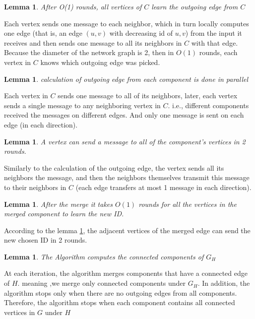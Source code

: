 \documentclass[11pt]{article}
\newtheorem{lemma}[theorem]{Lemma}
\begin{document}
\begin{lemma}
After O(1) rounds, all vertices of $C$ learn the outgoing edge from $C$ 
\end{lemma}
Each vertex sends one message to each neighbor, which in turn locally computes one edge (that is, an edge $(u,v)$ with decreasing id of $u,v$) from the input it receives and then sends one message to all its neighbors in $C$ with that edge.
Because the diameter of the network graph is 2, then in $O(1)$ rounds, each vertex in $C$ knows which outgoing edge was picked.

\begin{lemma}
calculation of outgoing edge from each component is done in parallel
\end{lemma}
Each vertex in $C$ sends one message to all of its neighbors, later, each vertex sends a single message to any neighboring vertex in $C$. i.e., different components received the messages on different edges. And only one message is sent on each edge (in each direction). 

\begin{lemma}
\label{message_transfer_2_rounds}
A vertex can send a message to all of the component's vertices in 2 rounds.
\end{lemma}
Similarly to the calculation of the outgoing edge, the vertex sends all its neighbors the message, and then the neighbors themselves transmit this message to their neighbors in $C$ (each edge transfers at most 1 message in each direction).

\begin{lemma}
After the merge it takes $O(1)$ rounds for all the vertices in the merged component to learn the new ID.
\end{lemma}
According to the lemma \ref{message_transfer_2_rounds}, the adjacent vertices of the merged edge can send the new chosen ID in 2 rounds.

\begin{lemma}
The Algorithm computes the connected components of $G_H$
\end{lemma}
At each iteration, the algorithm merges components that have a connected edge of $H$. meaning ,we merge only connected components under $G_H$. In addition, the algorithm stops only when there are no outgoing edges from all components. Therefore, the algorithm stops when each component contains all connected vertices in $G$ under $H$
\end{document}
